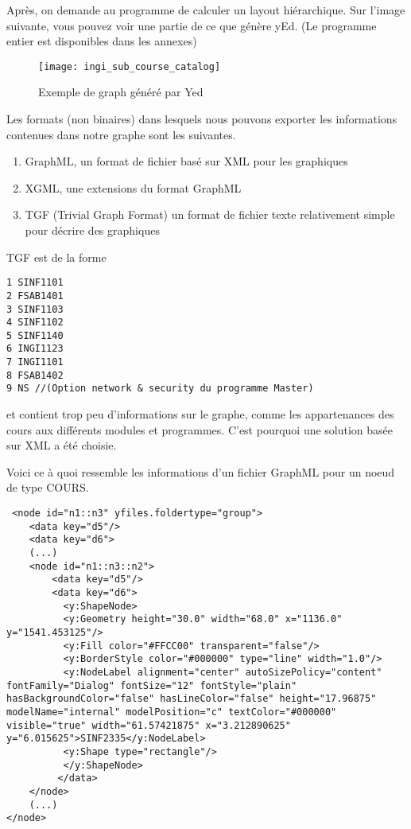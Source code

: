 Après, on demande au programme de calculer un layout hiérarchique. Sur l'image suivante, vous pouvez voir une partie de ce que génère yEd. (Le programme entier est disponibles dans les annexes)
\begin{figure}[H]
\centering
\texttt{[image: ingi\_sub\_course\_catalog]}
\caption{Exemple de graph généré par Yed}
\label{fig:subcatalog}
\end{figure}

Les formats (non binaires) dans lesquels nous pouvons exporter les informations contenues dans notre graphe sont les suivantes. 
\begin{enumerate}
\item GraphML, un format de fichier basé sur XML pour les graphiques
\item XGML, une extensions du format GraphML
\item TGF (Trivial Graph Format) un format de fichier texte relativement simple pour décrire des graphiques
\end{enumerate}

TGF est de la forme

\begin{lstlisting}
1 SINF1101
2 FSAB1401
3 SINF1103
4 SINF1102
5 SINF1140
6 INGI1123
7 INGI1101
8 FSAB1402
9 NS //(Option network & security du programme Master)
\end{lstlisting}

et contient trop peu d'informations sur le graphe, comme les appartenances des cours aux différents modules et programmes. C'est pourquoi une solution basée sur XML a été choisie.

Voici ce à quoi ressemble les informations d'un fichier GraphML pour un noeud de type COURS.
\begin{lstlisting}
 <node id="n1::n3" yfiles.foldertype="group">
 	<data key="d5"/>
    <data key="d6">
    (...)
	<node id="n1::n3::n2">
  		<data key="d5"/>
  		<data key="d6">
    	  <y:ShapeNode>
      	  <y:Geometry height="30.0" width="68.0" x="1136.0" y="1541.453125"/>
      	  <y:Fill color="#FFCC00" transparent="false"/>
      	  <y:BorderStyle color="#000000" type="line" width="1.0"/>
      	  <y:NodeLabel alignment="center" autoSizePolicy="content" fontFamily="Dialog" fontSize="12" fontStyle="plain" hasBackgroundColor="false" hasLineColor="false" height="17.96875" modelName="internal" modelPosition="c" textColor="#000000" visible="true" width="61.57421875" x="3.212890625" y="6.015625">SINF2335</y:NodeLabel>
      	  <y:Shape type="rectangle"/>
    	  </y:ShapeNode>
 		 </data>
	</node>
	(...)
</node>
\end{lstlisting}

